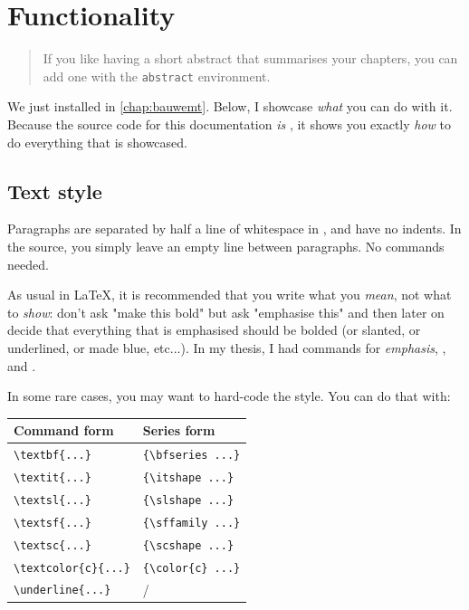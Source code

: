 \chapter{Functionality}\label{chap:functionality}
\begin{abstract}
If you like having a short abstract that summarises your chapters, you can add one with the \verb|abstract| environment.
\end{abstract}

We just installed \repo in \autoref{chap:bauwemt}. Below, I showcase \emph{what} you can do with it. Because the source code for this documentation \emph{is} \repo, it shows you exactly \emph{how} to do everything that is showcased.


\section{Text style}
Paragraphs are separated by half a line of whitespace in \repo, and have no indents. In the source, you simply leave an empty line between paragraphs. No commands needed.

As usual in \LaTeX{}, it is recommended that you write what you \emph{mean}, not what to \emph{show}: don't ask "make this bold" but ask "emphasise this" and then later on decide that everything that is emphasised should be bolded (or slanted, or underlined, or made blue, etc...). In my thesis, I had commands for \emph{emphasis}, , and .

In some rare cases, you may want to hard-code the style. You can do that with:
\begin{center}
\begin{tabular}{l|l}
\bfseries Command form & \bfseries Series form \\ \hline
\verb|\textbf{...}|       & \verb|{\bfseries ...}| \\
\verb|\textit{...}|       & \verb|{\itshape ...}| \\  
\verb|\textsl{...}|       & \verb|{\slshape ...}| \\
\verb|\textsf{...}|       & \verb|{\sffamily ...}| \\
\verb|\textsc{...}|       & \verb|{\scshape ...}| \\
\verb|\textcolor{c}{...}| & \verb|{\color{c} ...}| \\ 
\verb|\underline{...}| & /
\end{tabular}
\end{center}

